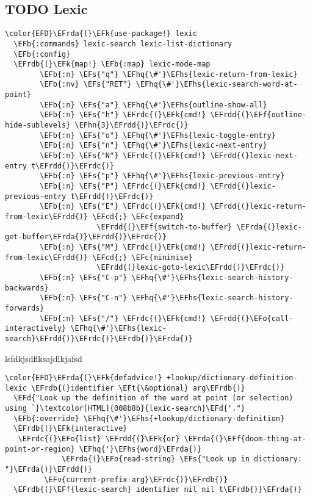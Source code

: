 \documentclass{article}
\newcommand{\EFc}[1]{\textcolor{EFc}{#1}} %
\newcommand{\EFcd}[1]{\textcolor{EFcd}{#1}} %
\newcommand{\EFs}[1]{\textcolor{EFs}{#1}} %
\newcommand{\EFd}[1]{\textcolor{EFd}{#1}} %
\newcommand{\EFk}[1]{\textcolor{EFk}{#1}} %
\newcommand{\EFb}[1]{\textcolor{EFb}{#1}} %
\newcommand{\EFf}[1]{\textcolor{EFf}{#1}} %
\newcommand{\EFv}[1]{\textcolor{EFv}{#1}} %
\newcommand{\EFt}[1]{\textcolor{EFt}{#1}} %
\newcommand{\EFo}[1]{\textcolor{EFo}{#1}} %
\newcommand{\EFhn}[1]{\textcolor{EFhn}{\textbf{#1}}} %
\newcommand{\EFhq}[1]{#1} %
\newcommand{\EFhs}[1]{\textcolor{EFhs}{#1}} %
\newcommand{\EFrda}[1]{\textcolor{EFrda}{#1}} %
\newcommand{\EFrdb}[1]{\textcolor{EFrdb}{#1}} %
\newcommand{\EFrdc}[1]{\textcolor{EFrdc}{#1}} %
\newcommand{\EFrdd}[1]{\textcolor{EFrdd}{#1}} %
\begin{document}
\subsection{{\bfseries\sffamily TODO} Lexic}
\label{sec:org519480a}
\begin{Code}
\begin{Verbatim}
\color{EFD}\EFrda{(}\EFk{use-package!} lexic
  \EFb{:commands} lexic-search lexic-list-dictionary
  \EFb{:config}
  \EFrdb{(}\EFk{map!} \EFb{:map} lexic-mode-map
        \EFb{:n} \EFs{"q"} \EFhq{\#'}\EFhs{lexic-return-from-lexic}
        \EFb{:nv} \EFs{"RET"} \EFhq{\#'}\EFhs{lexic-search-word-at-point}
        \EFb{:n} \EFs{"a"} \EFhq{\#'}\EFhs{outline-show-all}
        \EFb{:n} \EFs{"h"} \EFrdc{(}\EFk{cmd!} \EFrdd{(}\EFf{outline-hide-sublevels} \EFhn{3}\EFrdd{)}\EFrdc{)}
        \EFb{:n} \EFs{"o"} \EFhq{\#'}\EFhs{lexic-toggle-entry}
        \EFb{:n} \EFs{"n"} \EFhq{\#'}\EFhs{lexic-next-entry}
        \EFb{:n} \EFs{"N"} \EFrdc{(}\EFk{cmd!} \EFrdd{(}lexic-next-entry t\EFrdd{)}\EFrdc{)}
        \EFb{:n} \EFs{"p"} \EFhq{\#'}\EFhs{lexic-previous-entry}
        \EFb{:n} \EFs{"P"} \EFrdc{(}\EFk{cmd!} \EFrdd{(}lexic-previous-entry t\EFrdd{)}\EFrdc{)}
        \EFb{:n} \EFs{"E"} \EFrdc{(}\EFk{cmd!} \EFrdd{(}lexic-return-from-lexic\EFrdd{)} \EFcd{;} \EFc{expand}
                     \EFrdd{(}\EFf{switch-to-buffer} \EFrda{(}lexic-get-buffer\EFrda{)}\EFrdd{)}\EFrdc{)}
        \EFb{:n} \EFs{"M"} \EFrdc{(}\EFk{cmd!} \EFrdd{(}lexic-return-from-lexic\EFrdd{)} \EFcd{;} \EFc{minimise}
                     \EFrdd{(}lexic-goto-lexic\EFrdd{)}\EFrdc{)}
        \EFb{:n} \EFs{"C-p"} \EFhq{\#'}\EFhs{lexic-search-history-backwards}
        \EFb{:n} \EFs{"C-n"} \EFhq{\#'}\EFhs{lexic-search-history-forwards}
        \EFb{:n} \EFs{"/"} \EFrdc{(}\EFk{cmd!} \EFrdd{(}\EFo{call-interactively} \EFhq{\#'}\EFhs{lexic-search}\EFrdd{)}\EFrdc{)}\EFrdb{)}\EFrda{)}
\end{Verbatim}
\end{Code}

lsfdkjsdflksajdlkjafsd
\begin{Code}
\begin{Verbatim}
\color{EFD}\EFrda{(}\EFk{defadvice!} +lookup/dictionary-definition-lexic \EFrdb{(}identifier \EFt{\&optional} arg\EFrdb{)}
  \EFd{"Look up the definition of the word at point (or selection) using `}\textcolor[HTML]{008b8b}{lexic-search}\EFd{'."}
  \EFb{:override} \EFhq{\#'}\EFhs{+lookup/dictionary-definition}
  \EFrdb{(}\EFk{interactive}
   \EFrdc{(}\EFo{list} \EFrdd{(}\EFk{or} \EFrda{(}\EFf{doom-thing-at-point-or-region} \EFhq{'}\EFhs{word}\EFrda{)}
             \EFrda{(}\EFo{read-string} \EFs{"Look up in dictionary: "}\EFrda{)}\EFrdd{)}
         \EFv{current-prefix-arg}\EFrdc{)}\EFrdb{)}
  \EFrdb{(}\EFf{lexic-search} identifier nil nil t\EFrdb{)}\EFrda{)}
\end{Verbatim}
\end{Code}
\end{document}
